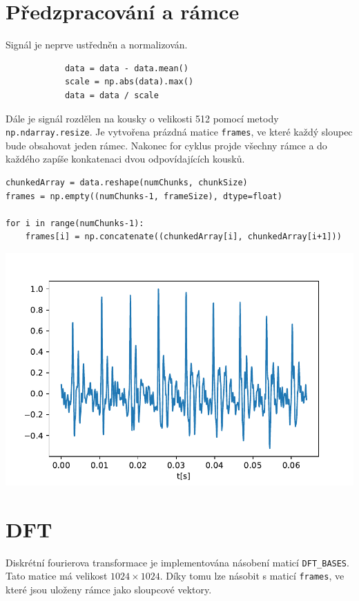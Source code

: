 \documentclass[12pt,a4paper]{article}
\begin{document}
		\newpage
	
	
	\section{Předzpracování a rámce}
		Signál je neprve ustředněn a normalizován.
		
		\begin{verbatim}
			data = data - data.mean()
			scale = np.abs(data).max()
			data = data / scale
		\end{verbatim}
		
		Dále je signál rozdělen na kousky o velikosti 512 pomocí metody \texttt{np.ndarray.resize}. 
		Je vytvořena prázdná matice \texttt{frames}, ve které každý sloupec bude obsahovat jeden rámec.
		Nakonec for cyklus projde všechny rámce a do každého zapíše konkatenaci dvou odpovídajících kousků.
		
		\begin{verbatim}
chunkedArray = data.reshape(numChunks, chunkSize)
frames = np.empty((numChunks-1, frameSize), dtype=float)

for i in range(numChunks-1):
    frames[i] = np.concatenate((chunkedArray[i], chunkedArray[i+1]))
		\end{verbatim}
		
		\includegraphics{img/frame.pdf}
		
		\newpage
		
	
	
	\section{DFT}
		Diskrétní fourierova transformace je implementována násobení maticí \texttt{DFT{\_}BASES}. 
		Tato matice má velikost \(1024{\times}1024\). 
		Díky tomu lze násobit s maticí \texttt{frames}, ve které jsou uloženy rámce jako sloupcové vektory.
		
\end{document}
